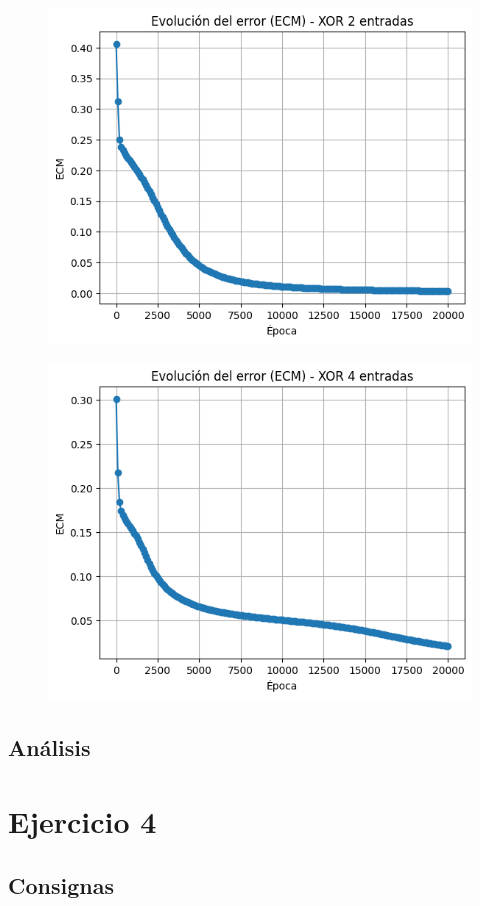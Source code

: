 \documentclass[11pt]{article} %
\begin{document}
\begin{figure}
	\centering
	\includegraphics[width=0.7\linewidth]{imgs/ej3__error_xor2}
	\caption{}
	\label{fig:ej3errorxor2}
\end{figure}

\begin{figure}
	\centering
	\includegraphics[width=0.7\linewidth]{imgs/ej3__error_xor4}
	\caption{}
	\label{fig:ej3errorxor4}
\end{figure}


\subsection{Análisis}


\section{Ejercicio 4}

\subsection{Consignas}
\end{document}
